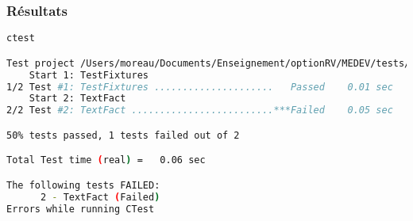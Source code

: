 \begin{frame}[fragile]
\frametitle{Résultats}
\begin{lstlisting}[language=Bash]
ctest

Test project /Users/moreau/Documents/Enseignement/optionRV/MEDEV/tests/code/boost/build
    Start 1: TestFixtures
1/2 Test #1: TestFixtures .....................   Passed    0.01 sec
    Start 2: TextFact
2/2 Test #2: TextFact .........................***Failed    0.05 sec

50% tests passed, 1 tests failed out of 2

Total Test time (real) =   0.06 sec

The following tests FAILED:
	  2 - TextFact (Failed)
Errors while running CTest
\end{lstlisting}

\end{frame}
